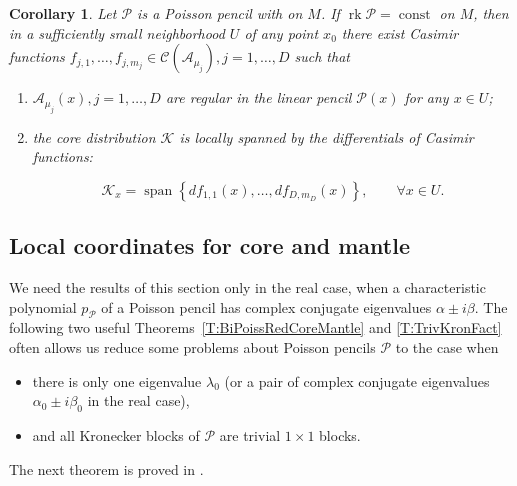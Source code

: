 \documentclass[12pt]{article}
\newtheorem{corollary}[lemma]{Corollary}
\theoremstyle{definition}
\begin{document}
\begin{corollary} \label{Cor:LocSpan} Let $\mathcal{P}$ is a Poisson pencil with  on $M$. If $\operatorname{rk} \mathcal{P} = \operatorname{const}$ on $M$, then in a sufficiently small neighborhood $U$ of any point $x_0$ there exist Casimir functions $f_{j, 1}, \dots, f_{j, m_j} \in \mathcal{C}\left(\mathcal{A}_{\mu_j}\right), j = 1, \dots, D$ such that 

\begin{enumerate} 

\item  $\mathcal{A}_{\mu_j}(x), j=1,\dots, D$ are regular in the linear pencil $\mathcal{P}(x)$ for any $x \in U$;  

\item the core distribution $\mathcal{K}$ is locally spanned by  the differentials of  Casimir functions:

\[ \mathcal{K}_x =  \operatorname{span} \left\{  df_{1, 1}(x), \dots, df_{D, m_D}(x) \right\}, \qquad \forall x \in U. \]

\end{enumerate}

\end{corollary}



\subsection{Local coordinates for core and mantle}

We need the results of this section only in the real case, when a characteristic polynomial $p_{\mathcal{P}}$ of a Poisson pencil has  complex conjugate eigenvalues $\alpha \pm i \beta$. The following two useful Theorems~\ref{T:BiPoissRedCoreMantle} and \ref{T:TrivKronFact} often allows us reduce some problems about Poisson pencils $\mathcal{P}$ to the case when 

\begin{itemize}

\item there is only one eigenvalue $\lambda_0$ (or a pair of complex conjugate eigenvalues $\alpha_0 \pm i \beta_0$ in the real case),

\item and all Kronecker blocks of $\mathcal{P}$ are trivial $1\times 1$ blocks.

\end{itemize} The next theorem is proved in \cite[Theorem 5.9]{Kozlov23JKRealization}.
\end{document}
